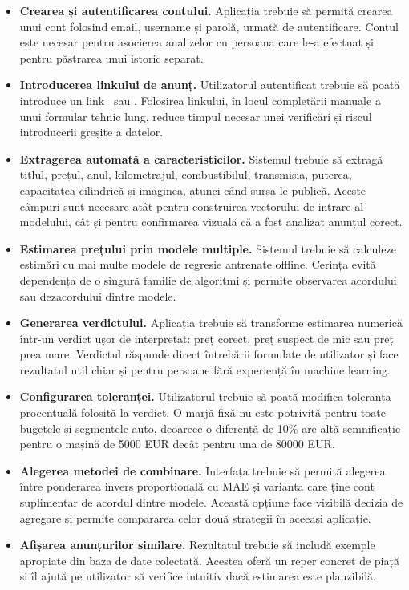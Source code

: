 \begin{itemize}
    \item \textbf{Crearea și autentificarea contului.} Aplicația trebuie să permită crearea unui cont folosind email, username și parolă, urmată de autentificare. Contul este necesar pentru asocierea analizelor cu persoana care le-a efectuat și pentru păstrarea unui istoric separat.
    \item \textbf{Introducerea linkului de anunț.} Utilizatorul autentificat trebuie să poată introduce un link \autovit\ sau \mobilede. Folosirea linkului, în locul completării manuale a unui formular tehnic lung, reduce timpul necesar unei verificări și riscul introducerii greșite a datelor.
    \item \textbf{Extragerea automată a caracteristicilor.} Sistemul trebuie să extragă titlul, prețul, anul, kilometrajul, combustibilul, transmisia, puterea, capacitatea cilindrică și imaginea, atunci când sursa le publică. Aceste câmpuri sunt necesare atât pentru construirea vectorului de intrare al modelului, cât și pentru confirmarea vizuală că a fost analizat anunțul corect.
    \item \textbf{Estimarea prețului prin modele multiple.} Sistemul trebuie să calculeze estimări cu mai multe modele de regresie antrenate offline. Cerința evită dependența de o singură familie de algoritmi și permite observarea acordului sau dezacordului dintre modele.
    \item \textbf{Generarea verdictului.} Aplicația trebuie să transforme estimarea numerică într-un verdict ușor de interpretat: preț corect, preț suspect de mic sau preț prea mare. Verdictul răspunde direct întrebării formulate de utilizator și face rezultatul util chiar și pentru persoane fără experiență în machine learning.
    \item \textbf{Configurarea toleranței.} Utilizatorul trebuie să poată modifica toleranța procentuală folosită la verdict. O marjă fixă nu este potrivită pentru toate bugetele și segmentele auto, deoarece o diferență de 10\% are altă semnificație pentru o mașină de 5000 EUR decât pentru una de 80000 EUR.
    \item \textbf{Alegerea metodei de combinare.} Interfața trebuie să permită alegerea între ponderarea invers proporțională cu MAE și varianta care ține cont suplimentar de acordul dintre modele. Această opțiune face vizibilă decizia de agregare și permite compararea celor două strategii în aceeași aplicație.
    \item \textbf{Afișarea anunțurilor similare.} Rezultatul trebuie să includă exemple apropiate din baza de date colectată. Acestea oferă un reper concret de piață și îl ajută pe utilizator să verifice intuitiv dacă estimarea este plauzibilă.

\end{itemize}
